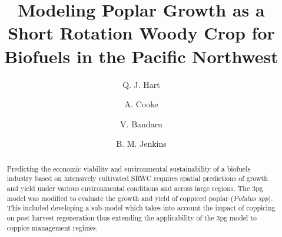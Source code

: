\documentclass[preprint,12pt]{elsarticle}
\begin{document}
\begin{frontmatter}



\title{Modeling Poplar Growth as a Short Rotation Woody Crop for Biofuels in the Pacific Northwest}


\author[lawr]{Q. J. Hart}
\author[pfc]{A. Cooke}
\author[bioag]{V. Bandaru}
\author[bioag]{B. M. Jenkins}

\address{Department of Land, Air, and Water, University of California, Davis, USA}
\address{Precision Forestry Cooperative, University of Washington, USA}
\address{Department of Biological and Agricultural Engineering, University of California, Davis, USA}

\begin{abstract}
  Predicting the economic viability and environmental sustainability
  of a biofuels industry based on intensively cultivated \acf{SRWC} requires spatial
  predictions of growth and yield under various
  environmental conditions and across large regions.  The \acf{3pg}
  model was modified to evaluate the growth and yield of coppiced
  poplar (\emph{Polulus spp}).  This included developing a sub-model 
  which takes into account the impact of coppicing on post harvest
  regeneration thus extending the applicability of the \acf{3pg} model
  to coppice management regimes.


\end{abstract}
\end{frontmatter}
\end{document}
